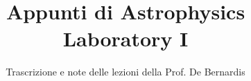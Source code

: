 \documentclass[a4paper,12pt]{article}
\title{Appunti di Astrophysics Laboratory I}
\author{Trascrizione e note delle lezioni della Prof. De Bernardis}
\date{}
\begin{document}
\maketitle
\projectintro
\tableofcontents
\newpage

\end{document}
